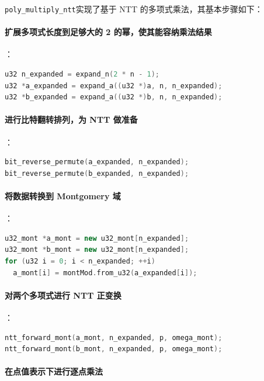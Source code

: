 \documentclass[a4paper]{article}
\begin{document}
\texttt{poly\_multiply\_ntt}实现了基于 NTT 的多项式乘法，其基本步骤如下：

\paragraph{扩展多项式长度到足够大的 2 的幂，使其能容纳乘法结果}

：

\begin{lstlisting}[language=C++]
u32 n_expanded = expand_n(2 * n - 1);
u32 *a_expanded = expand_a((u32 *)a, n, n_expanded);
u32 *b_expanded = expand_a((u32 *)b, n, n_expanded);
\end{lstlisting}

\paragraph{进行比特翻转排列，为 NTT 做准备}

：

\begin{lstlisting}[language=C++]
bit_reverse_permute(a_expanded, n_expanded);
bit_reverse_permute(b_expanded, n_expanded);
\end{lstlisting}

\paragraph{将数据转换到 Montgomery 域}

：

\begin{lstlisting}[language=C++]
u32_mont *a_mont = new u32_mont[n_expanded];
u32_mont *b_mont = new u32_mont[n_expanded];
for (u32 i = 0; i < n_expanded; ++i)
  a_mont[i] = montMod.from_u32(a_expanded[i]);
\end{lstlisting}

\paragraph{对两个多项式进行 NTT 正变换}

：

\begin{lstlisting}[language=C++]
ntt_forward_mont(a_mont, n_expanded, p, omega_mont);
ntt_forward_mont(b_mont, n_expanded, p, omega_mont);
\end{lstlisting}

\paragraph{在点值表示下进行逐点乘法}
\end{document}
